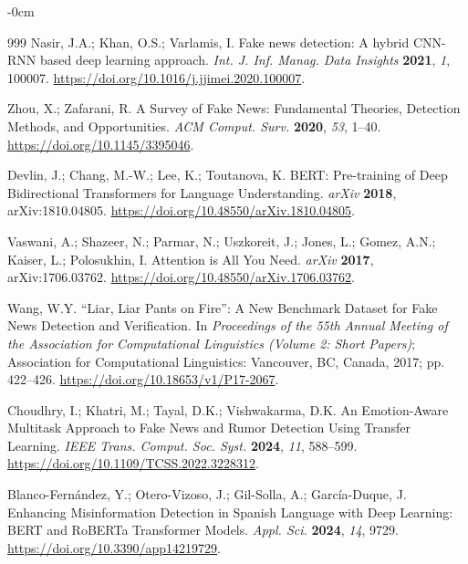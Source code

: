 \documentclass[informatics,article,accept,pdftex,moreauthors]{Definitions/mdpi}
\begin{document}
\begin{adjustwidth}{-\extralength}{0cm}
\begin{thebibliography}{999}
Nasir, J.A.; Khan, O.S.; Varlamis, I. Fake news detection: A hybrid CNN-RNN based deep learning approach. \textit{Int. J. Inf. Manag. Data Insights} \textbf{2021}, \textit{1}, 100007. \href{https://doi.org/10.1016/j.jjimei.2020.100007}{https://doi.org/10.1016/j.jjimei.2020.100007}.
 
Zhou, X.; Zafarani, R. A Survey of Fake News: Fundamental Theories, Detection Methods, and Opportunities. \textit{ACM Comput. Surv.} \textbf{2020}, \textit{53}, 1--40. \href{https://doi.org/10.1145/3395046}{https://doi.org/10.1145/3395046}.
 
Devlin, J.; Chang, M.-W.; Lee, K.; Toutanova, K. BERT: Pre-training of Deep Bidirectional Transformers for Language Understanding. \textit{arXiv} \textbf{2018}, arXiv:1810.04805. \href{https://doi.org/10.48550/arXiv.1810.04805}{https://doi.org/10.48550/arXiv.1810.04805}.
 
Vaswani, A.; Shazeer, N.; Parmar, N.; Uszkoreit, J.; Jones, L.; Gomez, A.N.; Kaiser, L.; Polosukhin, I. Attention is All You Need. \textit{arXiv} \textbf{2017}, arXiv:1706.03762. \href{https://doi.org/10.48550/arXiv.1706.03762}{https://doi.org/10.48550/arXiv.1706.03762}.
 
Wang, W.Y. ``Liar, Liar Pants on Fire'': A New Benchmark Dataset for Fake News Detection and Verification. In \emph{Proceedings of the 55th Annual Meeting of the Association for Computational Linguistics (Volume 2: Short Papers)}; Association for Computational Linguistics: Vancouver, BC, Canada, 2017; pp. 422--426. \href{https://doi.org/10.18653/v1/P17-2067}{https://doi.org/10.18653/v1/P17-2067}.
 
Choudhry, I.; Khatri, M.; Tayal, D.K.; Vishwakarma, D.K. An Emotion-Aware Multitask Approach to Fake News and Rumor Detection Using Transfer Learning. \textit{IEEE Trans. Comput. Soc. Syst.} \textbf{2024}, \textit{11}, 588--599. \href{https://doi.org/10.1109/TCSS.2022.3228312}{https://doi.org/10.1109/TCSS.2022.3228312}.
 
Blanco-Fernández, Y.; Otero-Vizoso, J.; Gil-Solla, A.; García-Duque, J. Enhancing Misinformation Detection in Spanish Language with Deep Learning: BERT and RoBERTa Transformer Models. \textit{Appl. Sci.} \textbf{2024}, \textit{14}, 9729. \href{https://doi.org/10.3390/app14219729}{https://doi.org/10.3390/app14219729}.
 

\end{thebibliography}
\end{adjustwidth}
\end{document}

